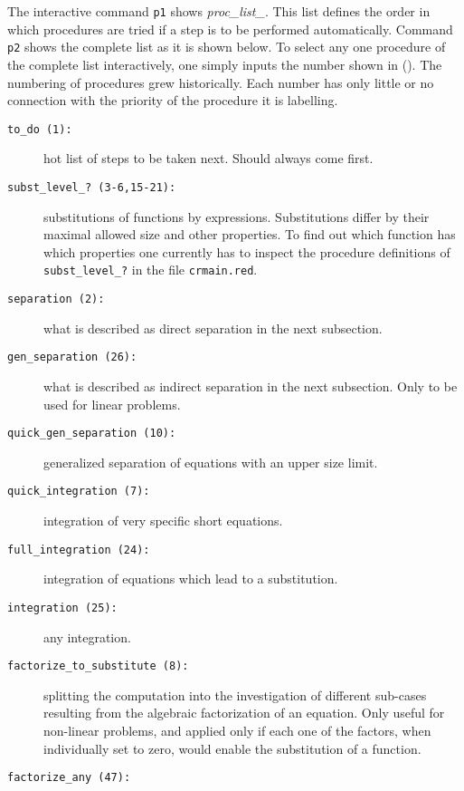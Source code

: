 The interactive command \texttt{p1} shows \emph{proc\_list\_}.  This
list defines the order in which procedures are tried if a step is to
be performed automatically.  Command \texttt{p2} shows the complete
list as it is shown below.  To select any one procedure of the
complete list interactively, one simply inputs the number shown in ().
The numbering of procedures grew historically.  Each number has only
little or no connection with the priority of the procedure it is
labelling.
\begin{description}
\item[\texttt{to\_do \hypertarget{crack-m_1}{(1)}:}] hot list of steps
  to be taken next.  Should always come first.
\item[\texttt{subst\_level\_? \hypertarget{crack-m_3}{(3-6,15-21)}:}]
  substitutions of functions by expressions.  Substitutions differ by
  their maximal allowed size and other properties.  To find out which
  function has which properties one currently has to inspect the
  procedure definitions of \texttt{subst\_level\_?} in the file
  \texttt{crmain.red}.
\item[\texttt{separation \hypertarget{crack-m_2}{(2)}:}] what is
  described as direct separation in the next subsection.
\item[\texttt{gen\_separation \hypertarget{crack-m_26}{(26)}:}] what
  is described as indirect separation in the next subsection.  Only to
  be used for linear problems.
\item[\texttt{quick\_gen\_separation \hypertarget{crack-m_10}{(10)}:}]
  generalized separation of equations with an upper size limit.
\item[\texttt{quick\_integration \hypertarget{crack-m_7}{(7)}:}]
  integration of very specific short equations.
\item[\texttt{full\_integration \hypertarget{crack-m_24}{(24)}:}]
  integration of equations which lead to a substitution.
\item[\texttt{integration \hypertarget{crack-m_25}{(25)}:}] any
  integration.
\item[\texttt{factorize\_to\_substitute
    \hypertarget{crack-m_8}{(8)}:}] splitting the computation into the
  investigation of different sub-cases resulting from the algebraic
  factorization of an equation.  Only useful for non-linear problems,
  and applied only if each one of the factors, when individually set
  to zero, would enable the substitution of a function.
\item[\texttt{factorize\_any \hypertarget{crack-m_47}{(47)}:}]

\end{description}

